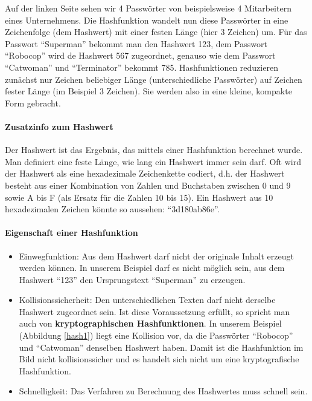 \documentclass[10pt,a4paper]{article}
\begin{document}
\noindent
Auf der linken Seite sehen wir 4 Passwörter von beispielsweise 4 Mitarbeitern eines Unternehmens. Die Hashfunktion  wandelt nun diese Passwörter in eine Zeichenfolge (dem Hashwert) mit einer festen Länge (hier 3 Zeichen) um. Für das Passwort "`Superman"' bekommt man den Hashwert 123, dem Passwort "`Robocop"' wird de Hashwert 567 zugeordnet, genauso wie dem Passwort "`Catwoman"' und "`Terminator"' bekommt 785.
Hashfunktionen reduzieren zunächst nur Zeichen beliebiger Länge (unterschiedliche Passwörter) auf Zeichen fester Länge (im Beispiel 3 Zeichen). Sie werden also in eine kleine, kompakte Form gebracht.

\paragraph*{Zusatzinfo zum Hashwert}Der Hashwert ist das Ergebnis, das mittels einer Hashfunktion berechnet wurde. Man definiert eine feste Länge, wie lang ein Hashwert immer sein darf. Oft wird der Hashwert als eine hexadezimale Zeichenkette codiert, d.h. der Hashwert besteht aus einer Kombination von Zahlen und Buchstaben zwischen 0 und 9 sowie A bis F (als Ersatz für die Zahlen 10 bis 15). Ein Hashwert aus 10 hexadezimalen Zeichen könnte so aussehen: "`3d180ab86e"'.

\paragraph*{Eigenschaft einer Hashfunktion}
\begin{itemize}[noitemsep,topsep=0pt,leftmargin=*]
    \item Einwegfunktion: Aus dem Hashwert darf nicht der originale Inhalt erzeugt werden können. In unserem Beispiel darf es nicht möglich sein, aus dem Hashwert "`123"' den Ursprungstext "`Superman"' zu erzeugen.
    \item Kollisionssicherheit: Den unterschiedlichen Texten darf nicht derselbe Hashwert zugeordnet sein. Ist diese Voraussetzung erfüllt, so spricht man auch von \textbf{kryptographischen Hashfunktionen}. In unserem Beispiel (Abbildung \ref{hash1}) liegt eine Kollision vor, da die Passwörter "`Robocop"' und "`Catwoman"' denselben Hashwert haben. Damit ist die Hashfunktion im Bild nicht kollisionssicher und es handelt sich nicht um eine kryptografische Hashfunktion.
    \item Schnelligkeit: Das Verfahren zu Berechnung des Hashwertes muss schnell sein.
\end{itemize}
\end{document}
